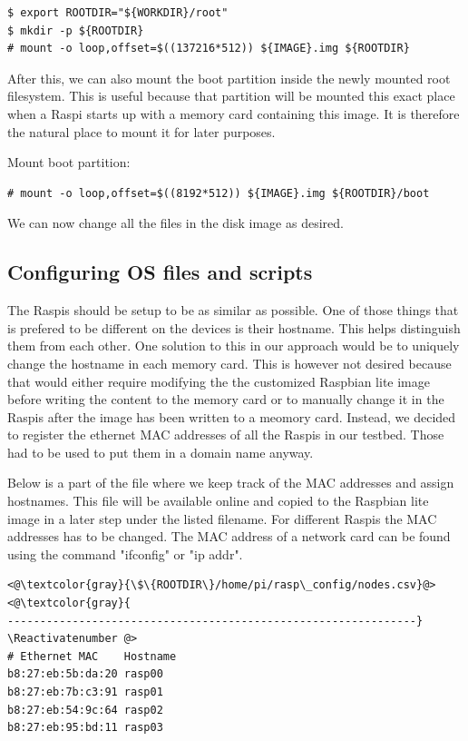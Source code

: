 \begin{lstlisting}[]
$ export ROOTDIR="${WORKDIR}/root"
$ mkdir -p ${ROOTDIR}
# mount -o loop,offset=$((137216*512)) ${IMAGE}.img ${ROOTDIR}
\end{lstlisting}
\FloatBarrier

After this, we can also mount the boot partition inside the newly mounted
root filesystem. This is useful because that partition will be mounted
this exact place when a \ac{Raspi} starts up with a memory card containing
this image. It is therefore the natural place to mount it for later purposes.

Mount boot partition:
\begin{lstlisting}[]
# mount -o loop,offset=$((8192*512)) ${IMAGE}.img ${ROOTDIR}/boot
\end{lstlisting}
\FloatBarrier

We can now change all the files in the disk image as desired.



\subsection{Configuring OS files and scripts}

The \ac{Raspi}s should be setup to be as similar as possible. One of those
things that is prefered to be different on the devices is their hostname.
This helps distinguish them from each other. One solution to this in our
approach would be to uniquely change the hostname in each memory card.
This is however not desired because that would either require modifying
the the customized Raspbian lite image before writing the content to the
memory card or to manually change it in the \ac{Raspi}s after the image has
been written to a meomory card.
Instead, we decided to register the ethernet MAC addresses of all the \ac{Raspi}s
in our testbed. Those had to be used to put them in a domain name anyway.

Below is a part of the file where we keep track of the MAC addresses and assign
hostnames. This file will be available online and copied to the Raspbian lite
image in a later step under the listed filename. For different \ac{Raspi}s
the MAC addresses has to be changed. The MAC address of a network card can be found
using the command "ifconfig" or "ip addr".

\Suppressnumber\begin{lstlisting}[]
<@\textcolor{gray}{\$\{ROOTDIR\}/home/pi/rasp\_config/nodes.csv}@>
<@\textcolor{gray}{
---------------------------------------------------------------}
\Reactivatenumber @>
# Ethernet MAC    Hostname
b8:27:eb:5b:da:20 rasp00
b8:27:eb:7b:c3:91 rasp01
b8:27:eb:54:9c:64 rasp02
b8:27:eb:95:bd:11 rasp03
\end{lstlisting}
\FloatBarrier

